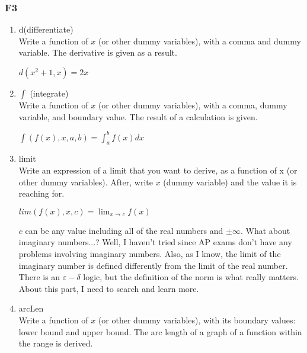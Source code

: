     \subsubsection{F3}
        \begin{enumerate}
            \item d(differentiate)\\
                Write a function of $x$ (or other dummy variables), with a comma and dummy variable. The derivative is given as a result.
                \begin{center}
                    $d(x^2 + 1, x) = 2x$
                \end{center}
            \item $\int$ (integrate)\\
                Write a function of $x$ (or other dummy variables), with a comma, dummy variable, and boundary value. The result of a calculation is given.
                \begin{center}
                    $\int(f(x), x, a, b) = \int_a ^b f(x) dx$
                \end{center}
                
            \item limit\\
                Write an expression of a limit that you want to derive, as a function of x (or other dummy variables). After, write $x$ (dummy variable) and the value it is reaching for.

                \begin{center}
                    $lim(f(x), x, c) = \lim_{x \rightarrow c} f(x)$
                \end{center}
                
                $c$ can be any value including all of the real numbers and $\pm \infty$. What about imaginary numbers...? Well, I haven't tried since AP exams don't have any problems involving imaginary numbers. Also, as I know, the limit of the imaginary number is defined differently from the limit of the real number. There is an $\varepsilon - \delta$ logic, but the definition of the norm is what really matters. About this part, I need to search and learn more.
            \item arcLen\\
                Write a function of $x$ (or other dummy variables), with its boundary values: lower bound and upper bound. The arc length of a graph of a function within the range is derived.
                

\end{enumerate}
